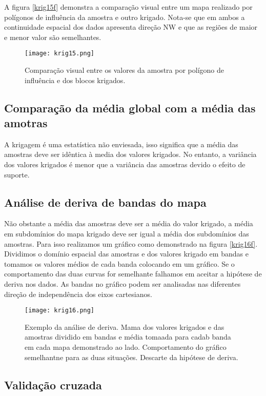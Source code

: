 A figura \eqref{krig15f} demonstra a comparação visual entre um mapa realizado por polígonos de influência da amostra e outro krigado. Nota-se que em ambos a continuidade espacial dos dados apresenta direção NW e que as regiões de maior e menor valor são semelhantes.

\begin{figure}[H]
	\centering
	\texttt{[image: krig15.png]}
	\caption{Comparação visual entre os valores da amostra por polígono de influência e dos blocos krigados.}
	\label{krig15f}
\end{figure}

\subsection{Comparação da média global com a média das amotras}

A krigagem é uma estatística não enviesada, isso significa que a média das amostras deve ser idêntica à media dos valores krigados. No entanto, a variância dos valores krigados é menor que a variância das amostras devido o efeito de suporte. 

\subsection{Análise de deriva de bandas do mapa}

Não obstante a média das amostras deve ser a média do valor krigado, a média em subdomínios do mapa krigado deve ser igual a média dos subdomínios das amostras. Para isso realizamos um gráfico como demonstrado na figura \eqref{krig16f}. Dividimos o domínio espacial das amostras e dos valores krigado em bandas e tomamos os valores médios de cada banda colocando em um gráfico. Se o comportamento das duas curvas for semelhante falhamos em aceitar a hipótese de deriva nos dados. As bandas no gráfico podem ser analisadas nas diferentes direção de independência dos eixos cartesianos.


\begin{figure}[H]
	\centering
	\texttt{[image: krig16.png]}
	\caption{Exemplo da análise de deriva. Mama dos valores krigados e das amostras dividido em bandas e média tomaada para cadab banda em cada mapa demonstrado ao lado. Comportamento do gráfico semelhantne para as duas situações. Descarte da hipótese de deriva.}
	\label{krig16f}
\end{figure}

\subsection{Validação cruzada}


